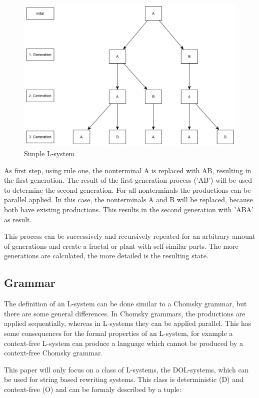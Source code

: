 \documentclass[english]{cpp-hmwk}
\begin{document}
\begin{figure}[h!]
	\centering
	\includegraphics[width=0.7\columnwidth]{../graphs/simple_lsystem.png}
	\caption{Simple L-system}
	\label{figure:simple_lsystem}
\end{figure}

As first step, using rule one, the nonterminal A is replaced with AB, resulting in the first generation. The result of the first generation process ('AB') will be used to determine the second generation. For all nonterminals the productions can be parallel applied. In this case, the nonterminals A and B will be replaced, because both have existing productions. This results in the second generation with 'ABA' as result.

\noindent This process can be successively and recursively repeated for an arbitrary amount of generations and create a fractal or plant with self-similar parts. The more generations are calculated, the more detailed is the resulting state. 

\subsection{Grammar}
\label{section:grammar}
The definition of an L-system can be done similar to a Chomsky grammar, but there are some general differences. In Chomsky grammars, the productions are applied sequentially, whereas in L-systems they can be applied parallel. This has some consequences for the formal properties of an L-system, for example a context-free L-system can produce a language which cannot be produced by a context-free Chomsky grammar.\cite[Cf. Chapter 1.1, p.~3]{prusinkiewiczp.lindenmayera.2004}

\noindent This paper will only focus on a class of L-systems, the DOL-systems, which can be used for string based rewriting systems. This class is deterministic (D) and context-free (O) and can be formaly described  by a tuple:
\end{document}
